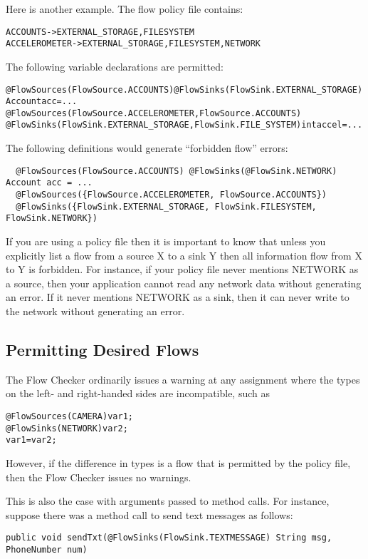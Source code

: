 Here is another example.
The flow policy file contains:
\begin{alltt}
  ACCOUNTS      -> EXTERNAL_STORAGE, FILESYSTEM
  ACCELEROMETER -> EXTERNAL_STORAGE, FILESYSTEM, NETWORK
\end{alltt}

The following variable declarations are permitted:
\begin{alltt}
  @FlowSources(FlowSource.ACCOUNTS) @FlowSinks(FlowSink.EXTERNAL_STORAGE) Account acc = ...
  @FlowSources({FlowSource.ACCELEROMETER, FlowSource.ACCOUNTS})
  @FlowSinks({FlowSink.EXTERNAL_STORAGE, FlowSink.FILE_SYSTEM}) int accel = ...
\end{alltt}

The following definitions would generate ``forbidden flow'' errors:
\begin{Verbatim}
  @FlowSources(FlowSource.ACCOUNTS) @FlowSinks(@FlowSink.NETWORK) Account acc = ...
  @FlowSources({FlowSource.ACCELEROMETER, FlowSource.ACCOUNTS})
  @FlowSinks({FlowSink.EXTERNAL_STORAGE, FlowSink.FILESYSTEM, FlowSink.NETWORK})
\end{Verbatim}

If you are using a policy file then it is important to know that unless
you explicitly list a flow from a source X to a sink Y then all
information flow from X to Y is forbidden.  For instance,
if  your policy file never mentions NETWORK as a source, then your application
cannot read any network data without generating an error.  If it never
mentions NETWORK as a sink, then it can never write to the network without
generating an error.



\subsection{Permitting Desired Flows}

The Flow Checker ordinarily issues a warning at any assignment where the types on the left- and right-handed sides are incompatible, such as
\begin{alltt}
@FlowSources(CAMERA) var1;
@FlowSinks(NETWORK) var2;
var1=var2;
\end{alltt}
However, if the difference in types is a flow that is permitted by the policy file, then the Flow Checker
issues no warnings.

This is also the case with arguments passed to method calls.  For instance, suppose there
was a method call to send text messages as follows:
\begin{Verbatim}
public void sendTxt(@FlowSinks(FlowSink.TEXTMESSAGE) String msg, PhoneNumber num)
\end{Verbatim}

